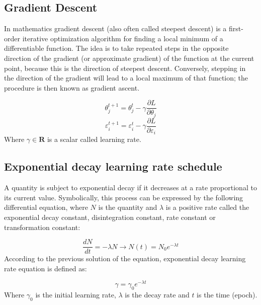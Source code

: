 \documentclass{article}
\begin{document}
\subsection{Gradient Descent}

In mathematics gradient descent (also often called steepest descent) is a first-order iterative optimization algorithm for finding a local minimum of a differentiable function. The idea is to take repeated steps in the opposite direction of the gradient (or approximate gradient) of the function at the current point, because this is the direction of steepest descent. Conversely, stepping in the direction of the gradient will lead to a local maximum of that function; the procedure is then known as gradient ascent.

$$\theta^{t+1}_{j} = \theta^{t}_{j} - \gamma \frac{\partial L}{\partial \theta_j}$$
$$\varepsilon^{t+1}_{i} = \varepsilon^{t}_{i} - \gamma \frac{\partial L}{\partial \varepsilon_i}$$
Where $\gamma \in \mathbf{R}$ is a scalar called learning rate.

\subsection{Exponential decay learning rate schedule}

A quantity is subject to exponential decay if it decreases at a rate proportional to its current value. Symbolically, this process can be expressed by the following differential equation, where $N$ is the quantity and $\lambda$ is a positive rate called the exponential decay constant, disintegration constant, rate constant or transformation constant:

$$\frac{dN}{dt} = -\lambda N \xrightarrow{} N(t) = N_0e^{-\lambda t}$$
According to the previous solution of the equation, exponential decay learning rate equation is defined as:

$$\gamma = \gamma_0 e^{-\lambda t}$$
Where $\gamma_0$ is the initial learning rate, $\lambda$ is the decay rate and $t$ is the time (epoch).
\end{document}
